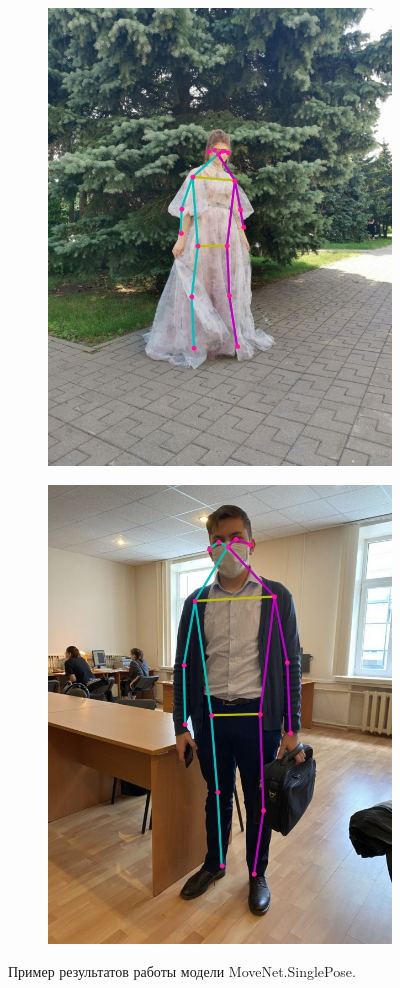 \begin{figure}[p]
\begin{subfigure}[b]{.5\textwidth}
    \includegraphics[height=\textwidth]{./images/MoveNet/36}
    \caption{ }
\end{subfigure}
\begin{subfigure}[b]{.5\textwidth}
	\centering
    \includegraphics[height=\textwidth]{./images/MoveNet/33}
    \caption{ }
\end{subfigure}
    \caption{Пример результатов работы модели MoveNet.SinglePose.}
    \label{fig:MN_result}
\end{figure}

